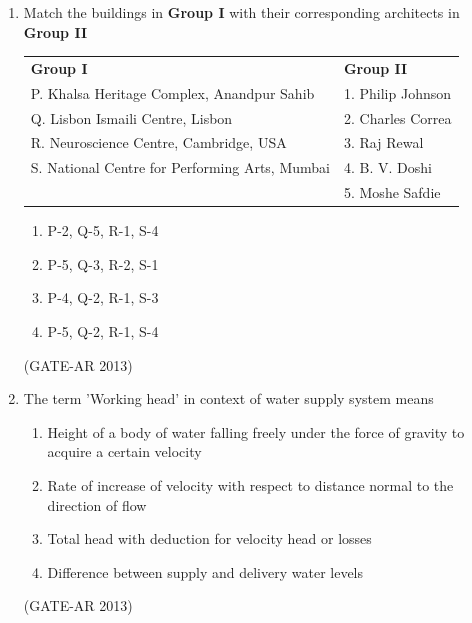 \documentclass[a4paper,10pt]{article}
\begin{document}
\begin{enumerate}
    \item Match the buildings in \textbf{Group I} with their corresponding architects in \textbf{Group II} \\
    \begin{tabular}{ l l }
	\textbf{Group I} & \textbf{Group II} \\
	P. Khalsa Heritage Complex, Anandpur Sahib & 1. Philip Johnson \\
	Q. Lisbon Ismaili Centre, Lisbon & 2. Charles Correa \\
	R. Neuroscience Centre, Cambridge, USA & 3. Raj Rewal \\
	S. National Centre for Performing Arts, Mumbai & 4. B. V. Doshi \\
	& 5. Moshe Safdie \\
	\end{tabular}
	\begin{multicols}{2}
	\begin{enumerate}
        \item P-2, Q-5, R-1, S-4
        \item P-5, Q-3, R-2, S-1
        \item P-4, Q-2, R-1, S-3
        \item P-5, Q-2, R-1, S-4
    \end{enumerate}
	\end{multicols}
    \hfill (GATE-AR 2013)

    \item The term 'Working head' in context of water supply system means 
    \begin{enumerate}
        \item Height of a body of water falling freely under the force of gravity to acquire a certain velocity
        \item Rate of increase of velocity with respect to distance normal to the direction of flow
        \item Total head with deduction for velocity head or losses
        \item Difference between supply and delivery water levels
    \end{enumerate}
    \hfill (GATE-AR 2013)


\end{enumerate}
\end{document}
